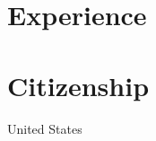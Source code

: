 \documentclass[line,margin]{res}
\begin{document}
\thispagestyle{empty}

\address{1201 West Park Street, Cedar Park, TX 78613-2801, United States}
\address{ \href{mailto:jsoltren@alum.mit.edu}{jsoltren@alum.mit.edu}
   +1 (347) 503-9558
   \url{https://www.linkedin.com/in/jsoltren}}

\begin{resume}



\section{Experience}


%



%
%



%







\section{Citizenship}
United States

\end{resume}
\end{document}
